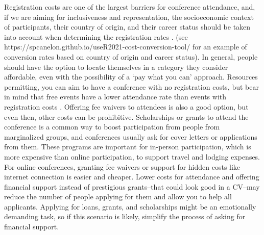 \documentclass[10pt,letterpaper]{article}
\begin{document}
Registration costs are one of the largest barriers for conference attendance, and, if we are aiming for inclusiveness and representation, the socioeconomic context of participants, their country of origin, and their career status should be taken into account when determining the registration rates \cite{sarabipourChangingScientificMeetings2021, andalibPostdocQueueLabour2018, kaplanPostdocNot2012}.
(see https://spcanelon.github.io/useR2021-cost-conversion-tool/ for an example of conversion rates based on country of origin and career status). 
In general, people should have the option to locate themselves in a category they consider affordable, even with the possibility of a `pay what you can' approach. 
Resources permitting, you can aim to have a conference with no registration costs, but bear in mind that free events have a lower attendance rate than events with registration costs \cite{eventbrite_ultimate_2017}. 
Offering fee waivers to attendees is also a good option, but even then, other costs can be prohibitive. 
Scholarships or grants to attend the conference is a common way to boost participation from people from marginalized groups, and conferences usually ask for cover letters or applications from them. 
These programs are important for in-person participation, which is more expensive than online participation, to support travel and lodging expenses. 
For online conferences, granting fee waivers or support for hidden costs like internet connection is easier and cheaper. 
Lower costs for attendance and offering financial support instead of prestigious grants--that could look good in a CV--may reduce the number of people applying for them and allow you to help all applicants. 
Applying for loans, grants, and scholarships might be an emotionally demanding task, so if this scenario is likely, simplify the process of asking for financial support. 


\end{document}
